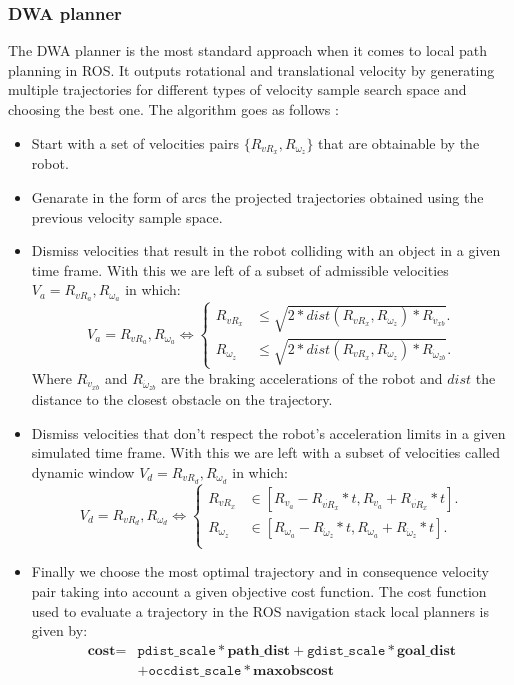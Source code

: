 \subsubsection{DWA planner}\label{dwa}
The \ac{DWA} planner is the most standard approach when it comes to local path planning in \ac{ROS}. It outputs  rotational and translational velocity by generating multiple trajectories for different types of velocity sample search space and choosing the best one. The algorithm goes as follows \cite{inbookdwa}:
\begin{itemize}
    \item Start with a set of velocities pairs $\{R_{vR_x},R_{ \omega_z} \}$ that are obtainable by the robot.
    \item Genarate in the form of arcs the projected trajectories obtained using the previous velocity sample space.
    \item Dismiss velocities that result in the robot colliding with an object in a given time frame. With this we are left of a subset of admissible velocities $V_a=R_{vR_a},R_{ \omega_a}$ in which:
    \begin{equation}
         V_a=R_{vR_a},R_{ \omega_a} \iff \begin{cases}
    R_{vR_x} & 	\leq \sqrt{2*dist(R_{vR_x},R_{ \omega_z})*R_{\dot{v}_{xb}}}.\\
    R_{ \omega_z}  &  	\leq \sqrt{2*dist(R_{vR_x},R_{ \omega_z})*R_{\dot{\omega}_{zb}}}.
  \end{cases}
    \end{equation}
    Where $R_{\dot{v}_{xb}}$ and $R_{\dot{\omega}_{zb}}$ are the braking accelerations of the robot and $dist$ the distance to the closest obstacle on the trajectory.
    
    
    \item Dismiss velocities that don't respect the robot's acceleration limits in a given simulated time frame. With this we are left with a subset of velocities called dynamic window $V_d=R_{vR_d},R_{ \omega_d}$  in which:
    \begin{equation}
         V_d=R_{vR_d},R_{ \omega_d} \iff \begin{cases}
    R_{vR_x} & 	\in [R_{v_a}-R_{\dot{vR}_{x}}*t,R_{v_a} + R_{\dot{vR}_{x}}*t].\\
    R_{\omega_z} & 	\in [R_{ \omega_a}-R_{\dot{\omega}_{z}}*t,R_{\omega_a}+R_{\dot{\omega}_{z}}*t].\\
  \end{cases}
    \end{equation}
    \item Finally we choose  the most optimal trajectory and in consequence velocity pair taking into account a given objective cost function.
    The cost function used to evaluate a trajectory in the \ac{ROS} navigation stack local planners is given by:
    \begin{align*}
            \textbf{cost} = &
       \texttt{pdist\_scale} * \textbf{path\_dist}
       + \texttt{gdist\_scale} * \textbf{goal\_dist}\\
       &+\texttt{occdist\_scale} * \textbf{maxobscost} 
    \end{align*}
    

\end{itemize}
